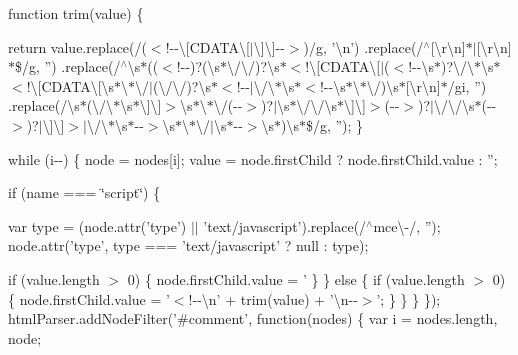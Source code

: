 \begin{DoxyCompactItemize}
{			function trim(value) \{
				
				return value.\+replace(/($<$!-\/-\/\textbackslash{}\mbox{[}\+C\+D\+A\+T\+A\textbackslash{}\mbox{[}$\vert$\textbackslash{}\mbox{]}\textbackslash{}\mbox{]}-\/-\/$>$)/g, '\textbackslash{}n')
						.\+replace(/$^\wedge$\mbox{[}\textbackslash{}r\textbackslash{}n\mbox{]}$\ast$$\vert$\mbox{[}\textbackslash{}r\textbackslash{}n\mbox{]}$\ast$\$/g, '')
						.\+replace(/$^\wedge$\textbackslash{}s$\ast$(($<$!-\/-\/)?(\textbackslash{}s$\ast$\textbackslash{}/\textbackslash{}/)?\textbackslash{}s$\ast$$<$!\textbackslash{}\mbox{[}\+C\+D\+A\+T\+A\textbackslash{}\mbox{[}$\vert$($<$!-\/-\/\textbackslash{}s$\ast$)?\textbackslash{}/\textbackslash{}$\ast$\textbackslash{}s$\ast$$<$!\textbackslash{}\mbox{[}\+C\+D\+A\+T\+A\textbackslash{}\mbox{[}\textbackslash{}s$\ast$\textbackslash{}$\ast$\textbackslash{}/$\vert$(\textbackslash{}/\textbackslash{}/)?\textbackslash{}s$\ast$$<$!-\/-\/$\vert$\textbackslash{}/\textbackslash{}$\ast$\textbackslash{}s$\ast$$<$!-\/-\/\textbackslash{}s$\ast$\textbackslash{}$\ast$\textbackslash{}/)\textbackslash{}s$\ast$\mbox{[}\textbackslash{}r\textbackslash{}n\mbox{]}$\ast$/gi, '')
						.\+replace(/\textbackslash{}s$\ast$(\textbackslash{}/\textbackslash{}$\ast$\textbackslash{}s$\ast$\textbackslash{}\mbox{]}\textbackslash{}\mbox{]}$>$\textbackslash{}s$\ast$\textbackslash{}$\ast$\textbackslash{}/(-\/-\/$>$)?$\vert$\textbackslash{}s$\ast$\textbackslash{}/\textbackslash{}/\textbackslash{}s$\ast$\textbackslash{}\mbox{]}\textbackslash{}\mbox{]}$>$(-\/-\/$>$)?$\vert$\textbackslash{}/\textbackslash{}/\textbackslash{}s$\ast$(-\/-\/$>$)?$\vert$\textbackslash{}\mbox{]}\textbackslash{}\mbox{]}$>$$\vert$\textbackslash{}/\textbackslash{}$\ast$\textbackslash{}s$\ast$-\/-\/$>$\textbackslash{}s$\ast$\textbackslash{}$\ast$\textbackslash{}/$\vert$\textbackslash{}s$\ast$-\/-\/$>$\textbackslash{}s$\ast$)\textbackslash{}s$\ast$\$/g, '');
			\}

			while (i-\/-\/) \{
				node = nodes\mbox{[}i\mbox{]};
				value = node.\+first\+Child ? node.\+first\+Child.\+value \+: '';

				if (name === \char`\"{}script\char`\"{}) \{
					
					var type = (node.\+attr('type') $\vert$$\vert$ 'text/javascript').\+replace(/$^\wedge$mce\textbackslash{}-\//, '');
					node.\+attr('type', type === 'text/javascript' ? null \+: type);

					if (value.\+length $>$ 0) \{
						node.\+first\+Child.\+value = '
					\}
				\} else \{
					if (value.\+length $>$ 0) \{
						node.\+first\+Child.\+value = '$<$!-\/-\/\textbackslash{}n' + trim(value) + '\textbackslash{}n-\/-\/$>$';
					\}
				\}
			\}
		\});  html\+Parser.\+add\+Node\+Filter('\#comment', function(nodes) \{
			var i = nodes.\+length, node;

}
\end{DoxyCompactItemize}
